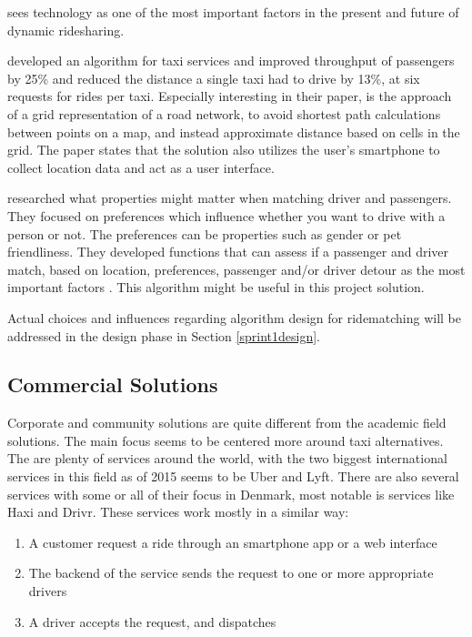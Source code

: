 \citet{doi:10.1080/01441647.2011.621557, amey2011real} sees technology as one of the most important factors in the present and future of dynamic ridesharing.

\citet{ShuoMa2013} developed an algorithm for taxi services and improved throughput of passengers by 25\% and reduced the distance a single taxi had to drive by 13\%, at six requests for rides per taxi. %
Especially interesting in their paper, is the approach of a grid representation of a road network, to avoid shortest path calculations between points on a map, and instead approximate distance based on cells in the grid.
The paper states that the solution also utilizes the user's smartphone to collect location data and act as a user interface.

\citet{ghoseiri2011real} researched what properties might matter when matching driver and passengers.
They focused on preferences which influence whether you want to drive with a person or not. The preferences can be properties such as gender or pet friendliness.
They developed functions that can assess if a passenger and driver match, based on location, preferences, passenger and/or driver detour as the most important factors \cite{ghoseiri2011real}.
This algorithm might be useful in this project solution.

Actual choices and influences regarding algorithm design for ridematching will be addressed in the design phase in Section \ref{sprint1design}.

\subsection{Commercial Solutions}
Corporate and community solutions are quite different from the academic field solutions.
The main focus seems to be centered more around taxi alternatives.
The are plenty of services around the world, with the two biggest international services in this field as of 2015 seems to be Uber and Lyft\cite{ridehail}.
There are also several services with some or all of their focus in Denmark, most notable is services like Haxi and Drivr.
These services work mostly in a similar way: 

\begin{enumerate}
	\item A customer request a ride through an smartphone app or a web interface
	\item The backend of the service sends the request to one or more appropriate drivers
	\item A driver accepts the request, and dispatches
\end{enumerate}

